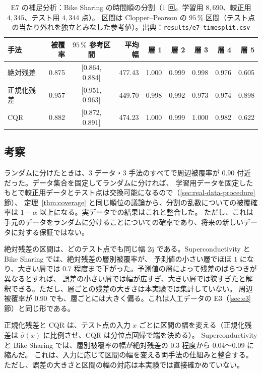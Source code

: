 \documentclass[a4paper,11pt]{jsarticle}
\theoremstyle{definition}
\theoremstyle{plain}
\theoremstyle{remark}
\newcommand{\qhat}{\hat{q}}
\begin{document}
\begin{table}[htbp]
  \centering
  \caption{E7 の補足分析：Bike Sharing の時間順の分割（$1$ 回。学習用 $8{,}690$、較正用 $4{,}345$、テスト用 $4{,}344$ 点）。
    区間は Clopper--Pearson の $95\,\%$ 区間（テスト点の当たり外れを独立とみなした参考値）。出典：\texttt{results/e7\_timesplit.csv}}
  \label{tab:e7-timesplit}
  \small
  \begin{tabular}{lrcrrrrrr}
    \toprule
    手法 & 被覆率 & $95\,\%$ 参考区間 & 平均幅 & 層 1 & 層 2 & 層 3 & 層 4 & 層 5 \\
    \midrule
    絶対残差 & 0.875 & [0.864, 0.884] & 477.43 & 1.000 & 0.999 & 0.998 & 0.976 & 0.605 \\
    正規化残差 & 0.957 & [0.951, 0.963] & 449.70 & 0.998 & 0.992 & 0.973 & 0.974 & 0.898 \\
    CQR & 0.882 & [0.872, 0.891] & 474.23 & 1.000 & 0.999 & 1.000 & 0.982 & 0.622 \\
    \bottomrule
  \end{tabular}
\end{table}

\subsection{考察}
ランダムに分けたときは、$3$ データ・$3$ 手法のすべてで周辺被覆率が $0.90$ 付近だった。データ集合を固定してランダムに分ければ、
学習用データを固定したもとで較正用データとテスト点は交換可能になるので（\ref{sec:real-data-procedure}節）、
定理~\ref{thm:coverage} と同じ順位の議論から、分割の乱数についての被覆確率は $1-\alpha$ 以上になる。実データでの結果はこれと整合した。
ただし、これは手元のデータをランダムに分けることについての確率であり、将来の新しいデータに対する保証ではない。

絶対残差の区間は、どのテスト点でも同じ幅 $2\qhat$ である。Superconductivity と Bike Sharing では、絶対残差の層別被覆率が、
予測値の小さい層でほぼ $1$ になり、大きい層では $0.7$ 程度まで下がった。予測値の層によって残差のばらつきが異なるとすれば、
誤差の小さい層では幅が広すぎ、大きい層では狭すぎたと解釈できる。ただし、層ごとの残差の大きさは本実験では集計していない。
周辺被覆率が $0.90$ でも、層ごとには大きく偏る。これは人工データの E3（\ref{sec:e3}節）と同じ形である。

正規化残差と CQR は、テスト点の入力 $x$ ごとに区間の幅を変える（正規化残差は $\hat\sigma(x)$ に比例させ、CQR は分位点回帰で端を決める）。
Superconductivity と Bike Sharing では、層別被覆率の幅が絶対残差の $0.3$ 程度から $0.04$〜$0.09$ に縮んだ。
これは、入力に応じて区間の幅を変える両手法の仕組みと整合する。ただし、誤差の大きさと区間の幅の対応は本実験では直接確かめていない。
\end{document}
